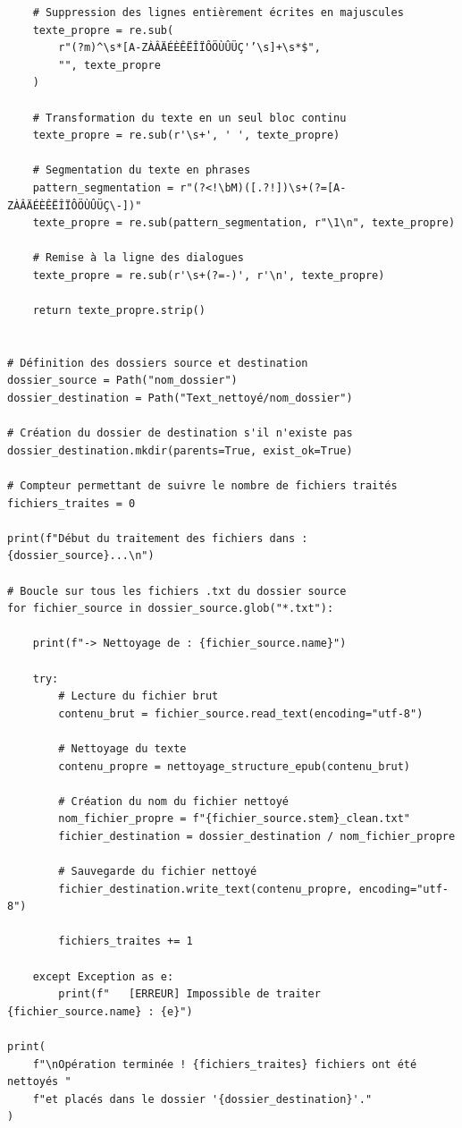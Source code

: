\begin{verbatim}
    # Suppression des lignes entièrement écrites en majuscules
    texte_propre = re.sub(
        r"(?m)^\s*[A-ZÀÂÄÉÈÊËÎÏÔÖÙÛÜÇ'’\s]+\s*$",
        "", texte_propre
    )

    # Transformation du texte en un seul bloc continu
    texte_propre = re.sub(r'\s+', ' ', texte_propre)

    # Segmentation du texte en phrases
    pattern_segmentation = r"(?<!\bM)([.?!])\s+(?=[A-ZÀÂÄÉÈÊËÎÏÔÖÙÛÜÇ\-])"
    texte_propre = re.sub(pattern_segmentation, r"\1\n", texte_propre)

    # Remise à la ligne des dialogues
    texte_propre = re.sub(r'\s+(?=-)', r'\n', texte_propre)

    return texte_propre.strip()


# Définition des dossiers source et destination
dossier_source = Path("nom_dossier")
dossier_destination = Path("Text_nettoyé/nom_dossier")

# Création du dossier de destination s'il n'existe pas
dossier_destination.mkdir(parents=True, exist_ok=True)

# Compteur permettant de suivre le nombre de fichiers traités
fichiers_traites = 0

print(f"Début du traitement des fichiers dans : {dossier_source}...\n")

# Boucle sur tous les fichiers .txt du dossier source
for fichier_source in dossier_source.glob("*.txt"):

    print(f"-> Nettoyage de : {fichier_source.name}")

    try:
        # Lecture du fichier brut
        contenu_brut = fichier_source.read_text(encoding="utf-8")

        # Nettoyage du texte
        contenu_propre = nettoyage_structure_epub(contenu_brut)

        # Création du nom du fichier nettoyé
        nom_fichier_propre = f"{fichier_source.stem}_clean.txt"
        fichier_destination = dossier_destination / nom_fichier_propre

        # Sauvegarde du fichier nettoyé
        fichier_destination.write_text(contenu_propre, encoding="utf-8")

        fichiers_traites += 1

    except Exception as e:
        print(f"   [ERREUR] Impossible de traiter {fichier_source.name} : {e}")

print(
    f"\nOpération terminée ! {fichiers_traites} fichiers ont été nettoyés "
    f"et placés dans le dossier '{dossier_destination}'."
)
\end{verbatim}